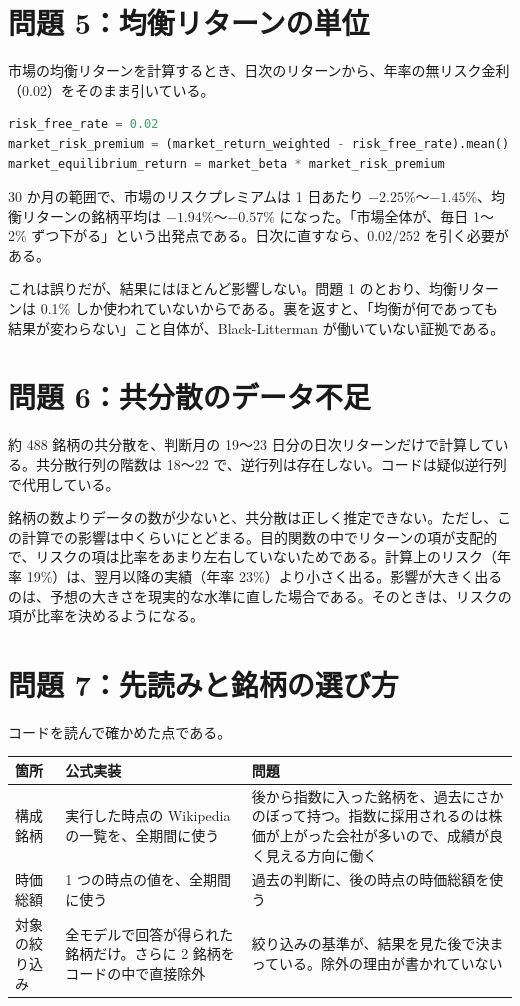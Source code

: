 \documentclass[xelatex,ja=standard,jafont=hiragino-pron,a4paper,10pt]{bxjsreport}
\newcommand{\code}[1]{\texttt{#1}}
\begin{document}
\section{問題 5：均衡リターンの単位}

市場の均衡リターンを計算するとき、日次のリターンから、年率の無リスク金利（0.02）をそのまま引いている。

\begin{lstlisting}[language=Python,caption={公式実装の該当箇所（\code{evaluate\_multiple.py}）}]
risk_free_rate = 0.02
market_risk_premium = (market_return_weighted - risk_free_rate).mean()
market_equilibrium_return = market_beta * market_risk_premium
\end{lstlisting}

30 か月の範囲で、市場のリスクプレミアムは 1 日あたり $-2.25\%$〜$-1.45\%$、均衡リターンの銘柄平均は $-1.94\%$〜$-0.57\%$ になった。「市場全体が、毎日 1〜2\% ずつ下がる」という出発点である。日次に直すなら、$0.02/252$ を引く必要がある。

これは誤りだが、結果にはほとんど影響しない。問題 1 のとおり、均衡リターンは 0.1\% しか使われていないからである。裏を返すと、「均衡が何であっても結果が変わらない」こと自体が、Black-Litterman が働いていない証拠である。

\section{問題 6：共分散のデータ不足}

約 488 銘柄の共分散を、判断月の 19〜23 日分の日次リターンだけで計算している。共分散行列の階数は 18〜22 で、逆行列は存在しない。コードは疑似逆行列で代用している。

銘柄の数よりデータの数が少ないと、共分散は正しく推定できない。ただし、この計算での影響は中くらいにとどまる。目的関数の中でリターンの項が支配的で、リスクの項は比率をあまり左右していないためである。計算上のリスク（年率 19\%）は、翌月以降の実績（年率 23\%）より小さく出る。影響が大きく出るのは、予想の大きさを現実的な水準に直した場合である。そのときは、リスクの項が比率を決めるようになる。

\section{問題 7：先読みと銘柄の選び方}

コードを読んで確かめた点である。

\begin{longtable}{p{2.60cm}p{5.20cm}p{6.60cm}}
\toprule
\textbf{箇所} & \textbf{公式実装} & \textbf{問題} \\
\midrule
\endfirsthead
\bottomrule
\endfoot
構成銘柄 & 実行した時点の Wikipedia の一覧を、全期間に使う & 後から指数に入った銘柄を、過去にさかのぼって持つ。指数に採用されるのは株価が上がった会社が多いので、成績が良く見える方向に働く \\
時価総額 & 1 つの時点の値を、全期間に使う & 過去の判断に、後の時点の時価総額を使う \\
対象の絞り込み & 全モデルで回答が得られた銘柄だけ。さらに 2 銘柄をコードの中で直接除外 & 絞り込みの基準が、結果を見た後で決まっている。除外の理由が書かれていない \\
\end{longtable}
\end{document}
